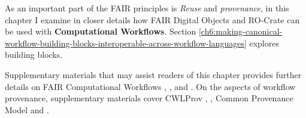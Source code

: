 As an important part of the FAIR principles is \emph{Reuse} and \emph{provenance}, in this chapter I examine in closer details how FAIR Digital Objects and RO-Crate can be used with \textbf{Computational Workflows}. 
Section \vref{ch6:making-canonical-workflow-building-blocks-interoperable-across-workflow-languages} explores building blocks.

Supplementary materials that may assist readers of this chapter provides further details on FAIR Computational Workflows \cite{Goble 2020},  \cite{Goble 2021},  \cite{Crusoe 2022} and  \cite{ch6-37}. 
On the aspects of workflow provenance, supplementary materials cover CWLProv \cite{ch5-68},  \cite{De Geest 2022}, Common Provenance Model \cite{Wittner 2020,Wittner 2023} and  \cite{workflow-run-crate}.
